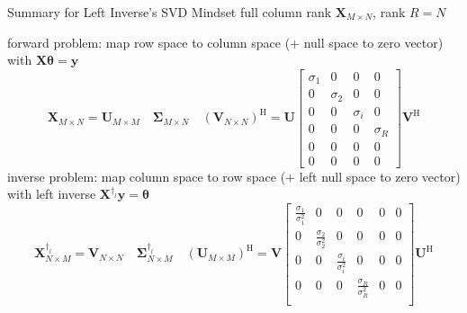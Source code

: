 \documentclass[mathserif, aspectratio=1610]{intbeamer}
\begin{document}
\begin{frame}{Summary for Left Inverse's SVD Mindset}
full column rank $\bm{X}_{M \times N}$, rank $R=N$

forward problem: map row space to column space (+ null space to zero vector) with $\bm{X} \bm{\theta} = \bm{y}$
$$
\bm{X}_{M \times N}
=
\bm{U}_{M \times M}\quad
\bm{\Sigma}_{M \times N}\quad
(\bm{V}_{N \times N})^\mathrm{H}=
\bm{U}
\begin{bmatrix}
\sigma_1  & 0  & 0 & 0\\
0 & \sigma_2 & 0 & 0\\
0 & 0 & \sigma_i & 0\\
0 & 0 & 0 & \sigma_R\\
0 & 0 & 0 & 0\\
0 & 0 & 0 & 0
\end{bmatrix}
\bm{V}^\mathrm{H}
$$
inverse problem: map column space to row space (+ left null space to zero vector) with left inverse $\bm{X}^{\dagger_l} \bm{y} = \bm{\theta}$
$$
\bm{X}^{\dagger_l}_{N \times M}
=
\bm{V}_{N \times N}\quad
\bm{\Sigma}^{\dagger_l}_{N \times M}\quad
(\bm{U}_{M \times M})^\mathrm{H}
=
\bm{V}
\begin{bmatrix}
\frac{\sigma_1}{\sigma_1^2} & 0 & 0 & 0 & 0 & 0\\
0 & \frac{\sigma_2}{\sigma_2^2} & 0 & 0 & 0 & 0\\
0 & 0 & \frac{\sigma_i}{\sigma_i^2} & 0 & 0 & 0\\
0 & 0 & 0 & \frac{\sigma_R}{\sigma_R^2} & 0 & 0\\
\end{bmatrix}
\bm{U}^\mathrm{H}
$$






\end{frame}
\end{document}
